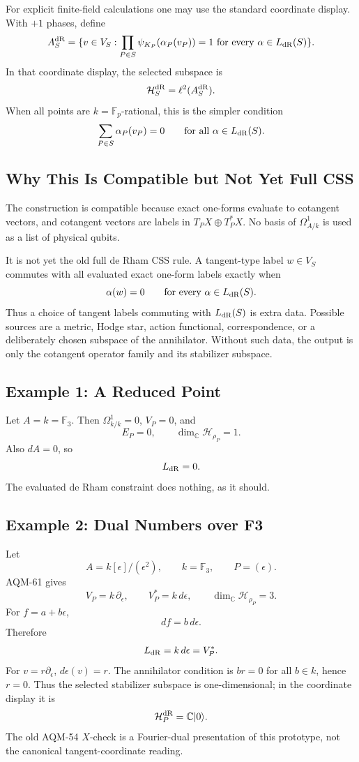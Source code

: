 For explicit finite-field calculations one may use the standard coordinate
display.  With \(+1\) phases, define
\[
  A_S^{\rm dR}=
  \{v\in V_S:
    \prod_{P\in S}\psi_{K_P}(\alpha_P(v_P))=1
    \text{ for every }\alpha\in L_{\rm dR}(S)\}.
\]
In that coordinate display, the selected subspace is
\[
  \mathcal H_S^{\rm dR}=\ell^2(A_S^{\rm dR}).
\]
When all points are \(k=\mathbb F_p\)-rational, this is the simpler condition
\[
  \sum_{P\in S}\alpha_P(v_P)=0
  \qquad\text{for all }\alpha\in L_{\rm dR}(S).
\]

\subsection{Why This Is Compatible but Not Yet Full CSS}

The construction is compatible because exact one-forms evaluate to cotangent
vectors, and cotangent vectors are labels in \(T_PX\oplus T_P^*X\).  No basis of
\(\Omega^1_{A/k}\) is used as a list of physical qubits.

It is not yet the old full de Rham CSS rule.  A tangent-type label
\(w\in V_S\) commutes with all evaluated exact one-form labels exactly when
\[
  \alpha(w)=0\qquad\text{for every }\alpha\in L_{\rm dR}(S).
\]
Thus a choice of tangent labels commuting with \(L_{\rm dR}(S)\) is extra data.
Possible sources are a metric, Hodge star, action functional, correspondence,
or a deliberately chosen subspace of the annihilator.  Without such data, the
output is only the cotangent operator family and its stabilizer subspace.

\subsection{Example 1: A Reduced Point}

Let \(A=k=\mathbb F_3\).  Then \(\Omega^1_{k/k}=0\), \(V_P=0\), and
\[
  E_P=0,\qquad \dim_{\mathbb C}\mathcal H_{\rho_P}=1.
\]
Also \(dA=0\), so
\[
  L_{\rm dR}=0.
\]
The evaluated de Rham constraint does nothing, as it should.

\subsection{Example 2: Dual Numbers over F3}

Let
\[
  A=k[\epsilon]/(\epsilon^2),\qquad k=\mathbb F_3,\qquad P=(\epsilon).
\]
AQM-61 gives
\[
  V_P=k\,\partial_\epsilon,\qquad V_P^*=k\,d\epsilon,\qquad
  \dim_{\mathbb C}\mathcal H_{\rho_P}=3.
\]
For \(f=a+b\epsilon\),
\[
  df=b\,d\epsilon.
\]
Therefore
\[
  L_{\rm dR}=k\,d\epsilon=V_P^*.
\]
For \(v=r\partial_\epsilon\), \(d\epsilon(v)=r\).  The annihilator condition is
\(br=0\) for all \(b\in k\), hence \(r=0\).  Thus the selected stabilizer
subspace is one-dimensional; in the coordinate display it is
\[
  \mathcal H_P^{\rm dR}=\mathbb C|0\rangle.
\]
The old AQM-54 \(X\)-check is a Fourier-dual presentation of this prototype,
not the canonical tangent-coordinate reading.

